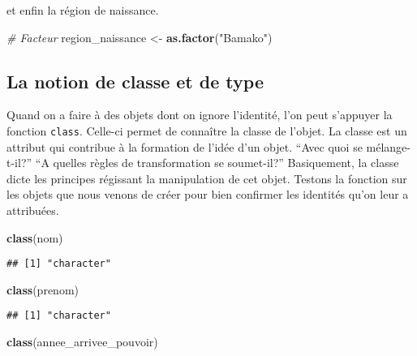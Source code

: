 \documentclass[]{book}
\newenvironment{Shaded}{\begin{snugshade}}{\end{snugshade}}
\newcommand{\KeywordTok}[1]{\textcolor[rgb]{0.13,0.29,0.53}{\textbf{#1}}}
\newcommand{\StringTok}[1]{\textcolor[rgb]{0.31,0.60,0.02}{#1}}
\newcommand{\CommentTok}[1]{\textcolor[rgb]{0.56,0.35,0.01}{\textit{#1}}}
\newcommand{\NormalTok}[1]{#1}
\begin{document}
et enfin la région de naissance.

\begin{Shaded}
\begin{Highlighting}[]
\CommentTok{# Facteur}
\NormalTok{region_naissance <-}\StringTok{ }\KeywordTok{as.factor}\NormalTok{(}\StringTok{"Bamako"}\NormalTok{)}
\end{Highlighting}
\end{Shaded}

\subsection{La notion de classe et de
type}\label{la-notion-de-classe-et-de-type}

Quand on a faire à des objets dont on ignore l'identité, l'on peut
s'appuyer la fonction \texttt{class}. Celle-ci permet de connaître la
classe de l'objet. La classe est un attribut qui contribue à la
formation de l'idée d'un objet. ``Avec quoi se mélange-t-il?'' ``A
quelles règles de transformation se soumet-il?'' Basiquement, la classe
dicte les principes régissant la manipulation de cet objet. Testons la
fonction sur les objets que nous venons de créer pour bien confirmer les
identités qu'on leur a attribuées.

\begin{Shaded}
\begin{Highlighting}[]
\KeywordTok{class}\NormalTok{(nom)}
\end{Highlighting}
\end{Shaded}

\begin{verbatim}
## [1] "character"
\end{verbatim}

\begin{Shaded}
\begin{Highlighting}[]
\KeywordTok{class}\NormalTok{(prenom)}
\end{Highlighting}
\end{Shaded}

\begin{verbatim}
## [1] "character"
\end{verbatim}

\begin{Shaded}
\begin{Highlighting}[]
\KeywordTok{class}\NormalTok{(annee_arrivee_pouvoir)}
\end{Highlighting}
\end{Shaded}
\end{document}
